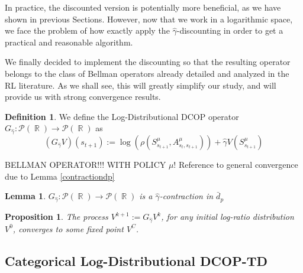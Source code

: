 \documentclass[12pt,a4paper,openright,twoside]{article}
\DeclareMathOperator*{\R}{\mathbb{R}}
\numberwithin{equation}{section}
\newtheorem{prop}[theorem]{Proposition}
\newtheorem{lemma}[theorem]{Lemma}
\theoremstyle{definition}
\newtheorem{definition}{Definition}
\theoremstyle{remark}
\theoremstyle{plain}
\begin{document}
In practice, the discounted version is potentially more beneficial, as we have shown in previous Sections. However, now that we work in a logarithmic space, we face the problem of how exactly apply the $\hat{\gamma}$-discounting in order to get a practical and reasonable algorithm. 

We finally decided to implement the discounting so that the resulting operator belongs to the class of Bellman operators already detailed and analyzed in the RL literature. As we shall see, this will greatly simplify our study, and will provide us with strong convergence results.


\begin{definition}
	We define the Log-Distributional DCOP operator $G_{\hat{\gamma}}: \mathscr{P}(\R) \rightarrow \mathscr{P}(\R)$ as
	\begin{equation}
		(G_{\hat{\gamma}} V) (s_{t+1}) := \log \left( \rho(S^{\mu}_{s_{t+1}},A^{\mu}_{s_{t},s_{t+1}}) \right) + \hat{\gamma} V(S^{\mu}_{s_{t+1}})
	\end{equation}
\end{definition}

BELLMAN OPERATOR!!! WITH POLICY $\mu$! Reference to general convergence due to Lemma \ref{contractiondp}

\begin{lemma} \label{contractiondpG}
	$G_{\hat{\gamma}} : \mathcal{P}(\R) \rightarrow \mathcal{P}(\R)$ is a $\hat{\gamma}$-contraction in $\bar{d}_p$
\end{lemma}

\begin{prop}
	The process $V^{k+1} := G_{\hat{\gamma}} V^k$, for any initial log-ratio distribution $V^0$, converges to some fixed point $V^C$.
\end{prop}




\subsection{Categorical Log-Distributional DCOP-TD}
\end{document}
